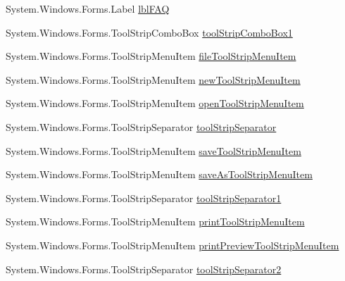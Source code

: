 \begin{DoxyCompactItemize}
\item 
\-System.\-Windows.\-Forms.\-Label \hyperlink{class_sr_p___classroom_inq_1_1frm_classrrom_inq_ab8a84057dad27dc977240ce7f96187c3}{lbl\-F\-A\-Q}
\item 
\-System.\-Windows.\-Forms.\-Tool\-Strip\-Combo\-Box \hyperlink{class_sr_p___classroom_inq_1_1frm_classrrom_inq_a0488696265840798a7bfd3cc7475f0af}{tool\-Strip\-Combo\-Box1}
\item 
\-System.\-Windows.\-Forms.\-Tool\-Strip\-Menu\-Item \hyperlink{class_sr_p___classroom_inq_1_1frm_classrrom_inq_a4aac2987ba1f61ee4bde4d91cdf35476}{file\-Tool\-Strip\-Menu\-Item}
\item 
\-System.\-Windows.\-Forms.\-Tool\-Strip\-Menu\-Item \hyperlink{class_sr_p___classroom_inq_1_1frm_classrrom_inq_ac3197c0c505ec97395ace77a88a8c068}{new\-Tool\-Strip\-Menu\-Item}
\item 
\-System.\-Windows.\-Forms.\-Tool\-Strip\-Menu\-Item \hyperlink{class_sr_p___classroom_inq_1_1frm_classrrom_inq_aabb3ca13577ddb31c75bcd459c075263}{open\-Tool\-Strip\-Menu\-Item}
\item 
\-System.\-Windows.\-Forms.\-Tool\-Strip\-Separator \hyperlink{class_sr_p___classroom_inq_1_1frm_classrrom_inq_a442caa4a21bb4dac8b91d82e24bec584}{tool\-Strip\-Separator}
\item 
\-System.\-Windows.\-Forms.\-Tool\-Strip\-Menu\-Item \hyperlink{class_sr_p___classroom_inq_1_1frm_classrrom_inq_a7e580a014ae78cc9e8d2ce621a2541f3}{save\-Tool\-Strip\-Menu\-Item}
\item 
\-System.\-Windows.\-Forms.\-Tool\-Strip\-Menu\-Item \hyperlink{class_sr_p___classroom_inq_1_1frm_classrrom_inq_a660ffe654aa61a06b147d2220fc5c75d}{save\-As\-Tool\-Strip\-Menu\-Item}
\item 
\-System.\-Windows.\-Forms.\-Tool\-Strip\-Separator \hyperlink{class_sr_p___classroom_inq_1_1frm_classrrom_inq_a3bec3b534d141382d4525a9be840e911}{tool\-Strip\-Separator1}
\item 
\-System.\-Windows.\-Forms.\-Tool\-Strip\-Menu\-Item \hyperlink{class_sr_p___classroom_inq_1_1frm_classrrom_inq_ab2355ecf8174002162a103a7e7ee83f4}{print\-Tool\-Strip\-Menu\-Item}
\item 
\-System.\-Windows.\-Forms.\-Tool\-Strip\-Menu\-Item \hyperlink{class_sr_p___classroom_inq_1_1frm_classrrom_inq_a56c14d36b467c4787937369037c22717}{print\-Preview\-Tool\-Strip\-Menu\-Item}
\item 
\-System.\-Windows.\-Forms.\-Tool\-Strip\-Separator \hyperlink{class_sr_p___classroom_inq_1_1frm_classrrom_inq_aa51d7952b4dde9caa9d7e111353a2047}{tool\-Strip\-Separator2}

\end{DoxyCompactItemize}
